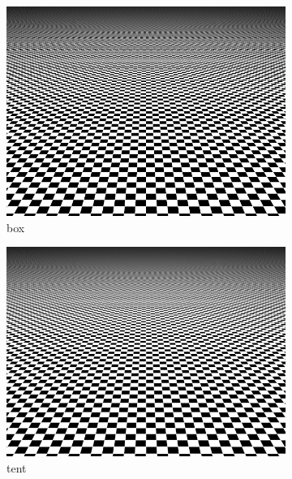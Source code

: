 \begin{figure}
    \centering
    \begin{subfigure}[t]{0.32\linewidth}
        \centering
        \includegraphics[width=\textwidth]{imgs/box.png}
        \caption{box}
        \label{fig:box_filter}
    \end{subfigure}
    \begin{subfigure}[t]{0.32\linewidth}
        \centering
        \includegraphics[width=\textwidth]{imgs/tent.png}
        \caption{tent}
        \label{fig:tent_filter}
    \end{subfigure}
    \begin{subfigure}[t]{0.32\linewidth}
        \centering

\end{subfigure}
\end{figure}
